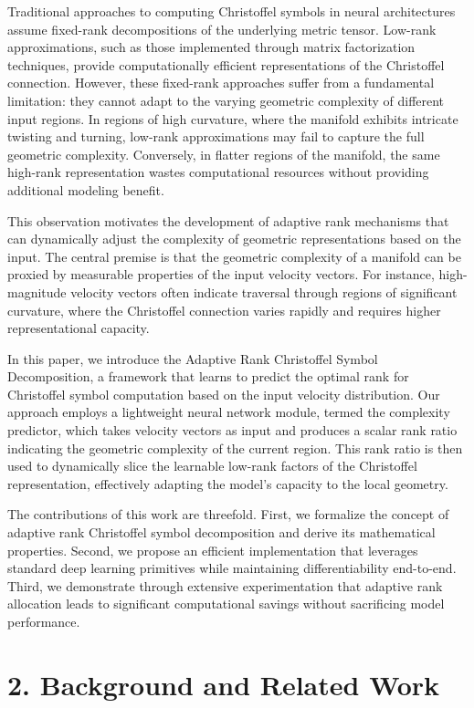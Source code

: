 \documentclass[12pt]{article}
\begin{document}
Traditional approaches to computing Christoffel symbols in neural architectures assume fixed-rank decompositions of the underlying metric tensor. Low-rank approximations, such as those implemented through matrix factorization techniques, provide computationally efficient representations of the Christoffel connection. However, these fixed-rank approaches suffer from a fundamental limitation: they cannot adapt to the varying geometric complexity of different input regions. In regions of high curvature, where the manifold exhibits intricate twisting and turning, low-rank approximations may fail to capture the full geometric complexity. Conversely, in flatter regions of the manifold, the same high-rank representation wastes computational resources without providing additional modeling benefit.

This observation motivates the development of adaptive rank mechanisms that can dynamically adjust the complexity of geometric representations based on the input. The central premise is that the geometric complexity of a manifold can be proxied by measurable properties of the input velocity vectors. For instance, high-magnitude velocity vectors often indicate traversal through regions of significant curvature, where the Christoffel connection varies rapidly and requires higher representational capacity.

In this paper, we introduce the Adaptive Rank Christoffel Symbol Decomposition, a framework that learns to predict the optimal rank for Christoffel symbol computation based on the input velocity distribution. Our approach employs a lightweight neural network module, termed the complexity predictor, which takes velocity vectors as input and produces a scalar rank ratio indicating the geometric complexity of the current region. This rank ratio is then used to dynamically slice the learnable low-rank factors of the Christoffel representation, effectively adapting the model's capacity to the local geometry.

The contributions of this work are threefold. First, we formalize the concept of adaptive rank Christoffel symbol decomposition and derive its mathematical properties. Second, we propose an efficient implementation that leverages standard deep learning primitives while maintaining differentiability end-to-end. Third, we demonstrate through extensive experimentation that adaptive rank allocation leads to significant computational savings without sacrificing model performance.

\section{2. Background and Related Work}
\end{document}
